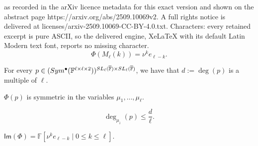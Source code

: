 \documentclass[10pt,a4paper]{amsart}
\newcommand{\IF}{\mathbb{F}}
\newcommand{\SL}{\textsf{\textup{SL}}}
\newcommand{\Sym}{\textup{Sym}}
\newcommand{\oIF}{{\overline{\mathbb{F}}}}
\renewcommand{\Im}{\mathsf{Im}}
\begin{document}
as recorded in the arXiv licence metadata for this exact version and shown on the abstract page https://arxiv.org/abs/2509.10069v2. A full rights notice is delivered at licenses/arxiv-2509.10069-CC-BY-4.0.txt. Characters: every retained excerpt is pure ASCII, so the delivered engine, XeLaTeX with its default Latin Modern text font, reports no missing character.
\begin{equation}\label{eq:PhiMe}
\Phi(M_\ell(k)) = \nu^{k} e_{\ell-k}.
\end{equation}

\begin{claim}\label{cla:multipleofell}
For every $p \in (\Sym^{\bullet}(\IF^{\ell\times\ell\times 2}))^{\SL_\ell(\oIF)\times \SL_\ell(\oIF)}$, we have that $d:=\deg(p)$ is a multiple of $\ell$.
\end{claim}

\begin{claim}\label{cla:symmetricinmu}
$\Phi(p)$ is symmetric in the variables $\mu_1,\ldots,\mu_\ell$.
\end{claim}

\begin{equation}\label{eq:degmui}
\textstyle\deg_{\mu_i}(p)\leq\frac{d}{\ell}.
\end{equation}

\begin{claim}
\label{cla:imageelemsym}
$\Im(\Phi) = \IF\left[\nu^k e_{\ell-k}\mid 0\leq k \leq \ell\right]$.
\end{claim}
\end{document}
